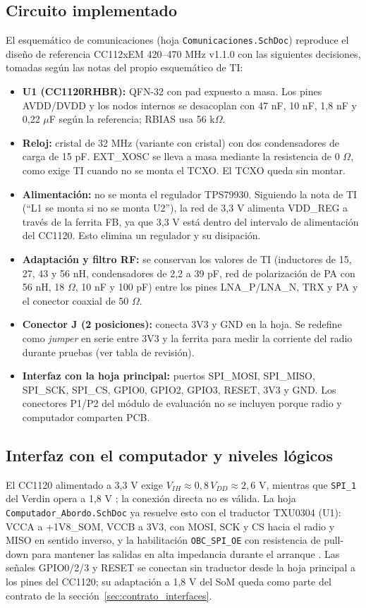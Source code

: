 \documentclass[11pt,letterpaper]{article}
\begin{document}
\subsection{Circuito implementado}
El esquemático de comunicaciones (hoja \texttt{Comunicaciones.SchDoc}) reproduce el diseño de referencia CC112xEM 420--470 MHz v1.1.0 \cite{cc1120em} con las siguientes decisiones, tomadas según las notas del propio esquemático de TI:
\begin{itemize}
\item \textbf{U1 (CC1120RHBR):} QFN-32 con pad expuesto a masa. Los pines AVDD/DVDD y los nodos internos se desacoplan con 47 nF, 10 nF, 1,8 nF y 0,22 $\mu$F según la referencia; RBIAS usa 56 k$\Omega$.
\item \textbf{Reloj:} cristal de 32 MHz (variante con cristal) con dos condensadores de carga de 15 pF. EXT\_XOSC se lleva a masa mediante la resistencia de 0 $\Omega$, como exige TI cuando no se monta el TCXO. El TCXO queda sin montar.
\item \textbf{Alimentación:} no se monta el regulador TPS79930. Siguiendo la nota de TI (``L1 se monta si no se monta U2''), la red de 3,3 V alimenta VDD\_REG a través de la ferrita FB, ya que 3,3 V está dentro del intervalo de alimentación del CC1120. Esto elimina un regulador y su disipación.
\item \textbf{Adaptación y filtro RF:} se conservan los valores de TI (inductores de 15, 27, 43 y 56 nH, condensadores de 2,2 a 39 pF, red de polarización de PA con 56 nH, 18 $\Omega$, 10 nF y 100 pF) entre los pines LNA\_P/LNA\_N, TRX y PA y el conector coaxial de 50 $\Omega$.
\item \textbf{Conector J (2 posiciones):} conecta 3V3 y GND en la hoja. Se redefine como \emph{jumper} en serie entre 3V3 y la ferrita para medir la corriente del radio durante pruebas (ver tabla de revisión).
\item \textbf{Interfaz con la hoja principal:} puertos SPI\_MOSI, SPI\_MISO, SPI\_SCK, SPI\_CS, GPIO0, GPIO2, GPIO3, RESET, 3V3 y GND. Los conectores P1/P2 del módulo de evaluación no se incluyen porque radio y computador comparten PCB.
\end{itemize}

\subsection{Interfaz con el computador y niveles lógicos}
El CC1120 alimentado a 3,3 V exige $V_{IH}\approx0{,}8\,V_{DD}\approx2{,}6$ V, mientras que \texttt{SPI\_1} del Verdin opera a 1,8 V \cite{verdinds}; la conexión directa no es válida. La hoja \texttt{Computador\_Abordo.SchDoc} ya resuelve esto con el traductor TXU0304 (U1): VCCA a +1V8\_SOM, VCCB a 3V3, con MOSI, SCK y CS hacia el radio y MISO en sentido inverso, y la habilitación \texttt{OBC\_SPI\_OE} con resistencia de pull-down para mantener las salidas en alta impedancia durante el arranque \cite{txu0202}. Las señales GPIO0/2/3 y RESET se conectan sin traductor desde la hoja principal a los pines del CC1120; su adaptación a 1,8 V del SoM queda como parte del contrato de la sección~\ref{sec:contrato_interfaces}.
\end{document}
